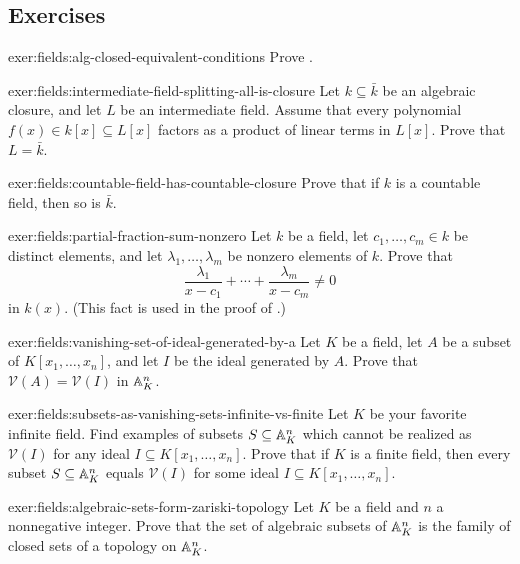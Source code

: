 \subsection*{Exercises}

\begin{exer}{}{exer:fields:alg-closed-equivalent-conditions}
  Prove .
\end{exer}
\begin{exer}{}{exer:fields:intermediate-field-splitting-all-is-closure}
  Let $k \subseteq \bar{k}$ be an algebraic closure, and let $L$ be an
  intermediate field. Assume that every polynomial
  $f(x) \in k[x] \subseteq L[x]$ factors as a product of linear terms
  in $L[x]$. Prove that $L = \bar{k}$.
\end{exer}
\begin{exer}{}{exer:fields:countable-field-has-countable-closure}
  Prove that if $k$ is a countable field, then so is $\bar{k}$.
\end{exer}
\begin{exer}{}{exer:fields:partial-fraction-sum-nonzero}
  Let $k$ be a field, let $c_1, \dots, c_m \in k$ be distinct
  elements, and let $\lambda_1, \dots, \lambda_m$ be nonzero elements
  of $k$. Prove that
  \[
    \frac{\lambda_1}{x - c_1} + \cdots + \frac{\lambda_m}{x - c_m}
    \neq 0
  \]
  in $k(x)$. (This fact is used in the proof of
  .)
\end{exer}
\begin{exer}{}{exer:fields:vanishing-set-of-ideal-generated-by-a}
  Let $K$ be a field, let $A$ be a subset of $K[x_1, \dots, x_n]$, and
  let $I$ be the ideal generated by $A$. Prove that
  $\mathcal{V}(A) = \mathcal{V}(I)$ in $\mathbb{A}^n_K$.
\end{exer}
\begin{exer}{}{exer:fields:subsets-as-vanishing-sets-infinite-vs-finite}
  Let $K$ be your favorite infinite field. Find examples of subsets
  $S \subseteq \mathbb{A}^n_K$ which cannot be realized as $\mathcal{V}(I)$
  for any ideal $I \subseteq K[x_1, \dots, x_n]$. Prove that if $K$ is
  a finite field, then every subset $S \subseteq \mathbb{A}^n_K$ equals
  $\mathcal{V}(I)$ for some ideal $I \subseteq K[x_1, \dots, x_n]$.
\end{exer}
\begin{exer}{}{exer:fields:algebraic-sets-form-zariski-topology}
  Let $K$ be a field and $n$ a nonnegative integer. Prove that the set
  of algebraic subsets of $\mathbb{A}^n_K$ is the family of closed sets of a
  topology on $\mathbb{A}^n_K$.
\end{exer}
